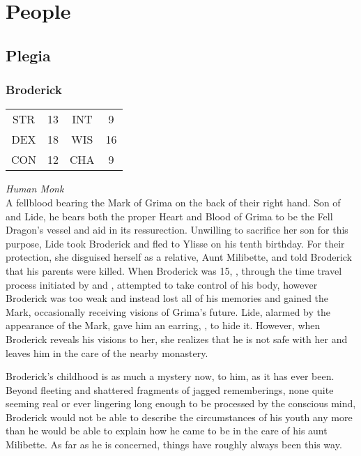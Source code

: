 
\section{People}
\subsection{Plegia}


\subsubsection{Broderick}
\label{people:tslil}
\begin{center}
\begin{tabular}{c c|c c}
STR & 13 & INT & 9\\
DEX & 18 & WIS & 16 \\
CON & 12 & CHA & 9 \end{tabular}\end{center}
\textit{Human Monk}\\
A fellblood bearing the Mark of Grima on the back of their right hand. Son of  and Lide, he bears both the proper Heart and Blood of Grima to be the Fell Dragon's vessel and aid in its ressurection. Unwilling to sacrifice her son for this purpose, Lide took Broderick and fled to Ylisse on his tenth birthday. For their protection, she disguised herself as a relative, Aunt Milibette, and told Broderick that his parents were killed. When Broderick was 15, , through the time travel process initiated by  and , attempted to take control of his body, however Broderick was too weak and instead lost all of his memories and gained the Mark, occasionally receiving visions of Grima's future. Lide, alarmed by the appearance of the Mark, gave him an earring, , to hide it. However, when Broderick reveals his visions to her, she realizes that he is not safe with her and leaves him in the care of the nearby monastery.

Broderick's childhood is as much a mystery now, to him, as it has ever
been. Beyond fleeting and shattered fragments of jagged rememberings,
none quite seeming real or ever lingering long enough to be processed
by the conscious mind, Broderick would not be able to describe the
circumstances of his youth any more than he would be able to explain
how he came to be in the care of his aunt Milibette. As far as he is
concerned, things have roughly always been this way.

